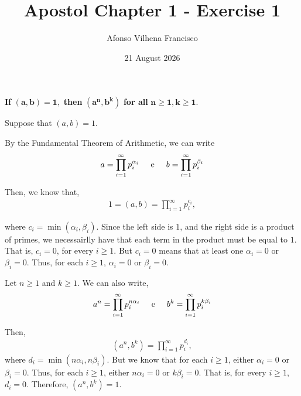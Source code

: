 \documentclass{article}
\title{Apostol Chapter 1 - Exercise 1}
\author{Afonso Vilhena Francisco}
\date{21 August 2026}
\begin{document}
\maketitle

\textbf{If} $\mathbf{(a,b)=1,}$ \textbf{then} $\mathbf{(a^n,b^k)}$ \textbf{for all} $\mathbf{n \geq1, k\geq 1.}$

\vspace{0.5cm}

Suppose that $(a,b)=1$.

By the Fundamental Theorem of Arithmetic, we can write
\begin{align*}
    a= \prod_{i=1}^\infty p_i^{\alpha_i} \hspace{0.5cm} \text{e} \hspace{0.5cm} b= \prod_{i=1}^\infty p_i^{\beta_i}
\end{align*}

Then, we know that, 
\begin{align*}
    1=(a,b)=\prod_{i=1}^\infty p_i^{c_i},
\end{align*}

where $c_i=\min (\alpha_i, \beta_i)$. Since the left side is $1$, and the right side is a product of primes, we necessairlly have that each term in the product must be equal to $1$. That is, $c_i=0$, for every $i \geq 1$. But $c_i=0$ means that at least one $\alpha_i=0$ or $\beta_i=0.$ Thus, for each $i \geq 1$, $\alpha_i=0$ or $\beta_i=0.$

\vspace{0.25cm}

Let $n\geq1$ and $k \geq 1$. We can also write,
\begin{align*}
    a^n = \prod_{i=1}^\infty p_i^{n\alpha_i} \hspace{0.5cm} \text{e} \hspace{0.5cm} b^k = \prod_{i=1}^\infty p_i^{k\beta_i}
\end{align*}

Then,
\begin{align*}
    (a^n,b^k)=\prod_{i=1}^\infty p_i^{d_i},
\end{align*}
where $d_i=\min(n\alpha_i,n\beta_i)$. But we know that for each $i \geq 1$, either $\alpha_i=0$ or $\beta_i=0$. Thus, for each $i \geq 1$, either $n\alpha_i=0$ or $k\beta_i=0$. That is, for every $i \geq 1$, $d_i=0$. Therefore, $(a^n,b^k)=1.$
\end{document}
